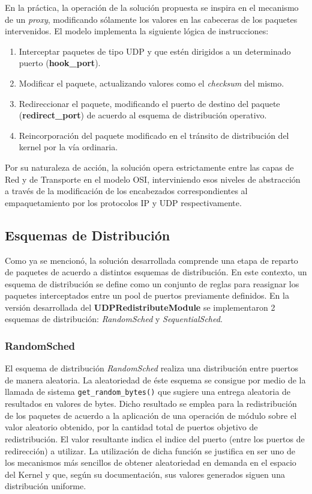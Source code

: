 En la práctica, la operación de la solución propuesta se inspira en el mecanismo de un \emph{proxy}, modificando sólamente los valores en las cabeceras de los paquetes intervenidos. El modelo implementa la siguiente lógica de instrucciones:

\begin{enumerate}
\item Interceptar paquetes de tipo UDP y que estén dirigidos a un determinado puerto (\textbf{hook\_port}).
\item Modificar el paquete, actualizando valores como el \emph{checksum} del mismo.
\item Redireccionar el paquete, modificando el puerto de destino del paquete (\textbf{redirect\_port}) de acuerdo al esquema de distribución operativo.
\item Reincorporación del paquete modificado en el tránsito de distribución del kernel por la vía ordinaria.
\end{enumerate}

Por su naturaleza de acción, la solución opera estrictamente entre las capas de Red y de Transporte en el modelo OSI, interviniendo esos niveles de abstracción a través de la modificación de los encabezados correspondientes al empaquetamiento por los protocolos IP y UDP respectivamente.

\subsection{Esquemas de Distribución}
Como ya se mencionó, la solución desarrollada comprende una etapa de reparto de paquetes de acuerdo a distintos esquemas de distribución. En este contexto, un esquema de distribución se define como un conjunto de reglas para reasignar los paquetes interceptados entre un pool de puertos previamente definidos. En la versión desarrollada del \textbf{UDPRedistributeModule} se implementaron 2 esquemas de distribución: \emph{RandomSched} y \emph{SequentialSched}.

\subsubsection{RandomSched}
El esquema de distribución \emph{RandomSched} realiza una distribución entre puertos de manera aleatoria. La aleatoriedad de éste esquema se consigue por medio de la llamada de sistema \verb=get_random_bytes()= que sugiere una entrega aleatoria de resultados en valores de bytes. Dicho resultado se emplea para la redistribución de los paquetes de acuerdo a la aplicación de una operación de módulo sobre el valor aleatorio obtenido, por la cantidad total de puertos objetivo de redistribución. El valor resultante indica el indice del puerto (entre los puertos de redirección) a utilizar. La utilización de dicha función se justifica en ser uno de los mecanismos más sencillos de obtener aleatoriedad en demanda en el espacio del Kernel y que, según su documentación, sus valores generados siguen una distribución uniforme.

